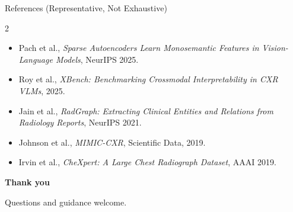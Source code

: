 \documentclass[aspectratio=169,11pt]{beamer}
\begin{document}
\begin{frame}{References (Representative, Not Exhaustive)}
\begin{multicols}{2}
\begin{itemize}
        \item Pach et al., \textit{Sparse Autoencoders Learn Monosemantic Features in Vision-Language Models}, NeurIPS 2025.
        \item Roy et al., \textit{XBench: Benchmarking Crossmodal Interpretability in CXR VLMs}, 2025.
        \item Jain et al., \textit{RadGraph: Extracting Clinical Entities and Relations from Radiology Reports}, NeurIPS 2021.
        \item Johnson et al., \textit{MIMIC-CXR}, Scientific Data, 2019.
        \item Irvin et al., \textit{CheXpert: A Large Chest Radiograph Dataset}, AAAI 2019.
    \end{itemize}
    \end{multicols}
\end{frame}

\begin{frame}
    \centering
    \vspace{1.5cm}
    {\LARGE \textbf{Thank you}}

    \vspace{0.8cm}
    {\normalsize Questions and guidance welcome.}
\end{frame}
\end{document}
